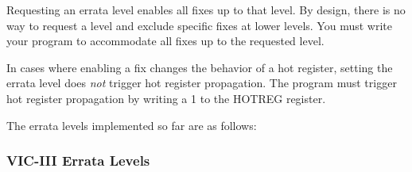 Requesting an errata level enables all fixes up to that level. By design, there is no way to request a level and exclude specific fixes at lower levels. You must write your program to accommodate all fixes up to the requested level.

In cases where enabling a fix changes the behavior of a hot register, setting the errata level does {\em{not}} trigger hot register propagation. The program must trigger hot register propagation by writing a 1 to the HOTREG register.

The errata levels implemented so far are as follows:

\subsubsection{VIC-III Errata Levels}

